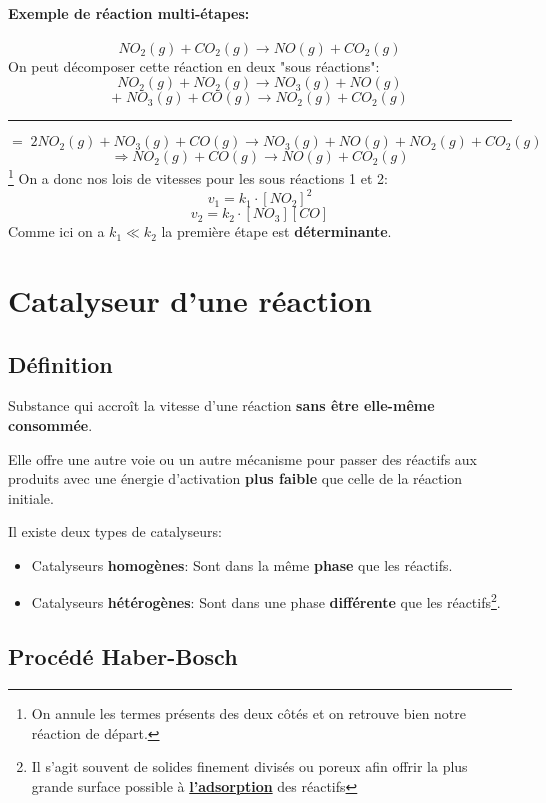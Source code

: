 \documentclass[10pt,a4paper]{book}
\begin{document}
\paragraph{Exemple de réaction multi-étapes:}
\[NO_2(g)+CO_2(g)\longrightarrow NO(g)+CO_2(g)\]
On peut décomposer cette réaction en deux "sous réactions":
\[NO_2(g)+NO_2(g)\longrightarrow NO_3(g)+NO(g) \tag*{1}\]
\[+ \; NO_3(g)+CO(g)\longrightarrow NO_2(g)+CO_2(g) \tag*{2}\]
\hrule
\[= \; 2NO_2(g)+NO_3(g)+CO(g) \longrightarrow NO_3(g)+NO(g)+NO_2(g)+CO_2(g)\]
\[\Rightarrow NO_2(g)+CO(g) \longrightarrow NO(g)+CO_2(g)\]\footnote{On annule les termes présents des deux côtés et on retrouve bien notre réaction de départ.}
On a donc nos lois de vitesses pour les sous réactions 1 et 2:
\[v_1 = k_1 \cdot [NO_2]^2\]
\[v_2 = k_2 \cdot [NO_3][CO]\]
Comme ici on a $k_1 \ll k_2$ la première étape est \textbf{déterminante}.

\section{Catalyseur d'une réaction}

\subsection{Définition}

Substance qui accroît la vitesse d’une réaction \textbf{sans être elle-même consommée}. \par
Elle offre une autre voie ou un autre mécanisme pour passer des réactifs aux produits avec une énergie d’activation \textbf{plus faible} que celle de la réaction initiale. \par
Il existe deux types de catalyseurs:
\begin{itemize}
\item Catalyseurs \textbf{homogènes}: Sont dans la même \textbf{phase} que les réactifs.
\item Catalyseurs \textbf{hétérogènes}: Sont dans une phase \textbf{différente} que les réactifs\footnote{Il s'agit souvent de solides finement divisés ou poreux afin offrir la plus grande surface possible à \href{https://fr.wikipedia.org/wiki/Adsorption}{\textbf{l'adsorption}} des réactifs}.
\end{itemize}

\subsection{Procédé Haber-Bosch}
\end{document}
